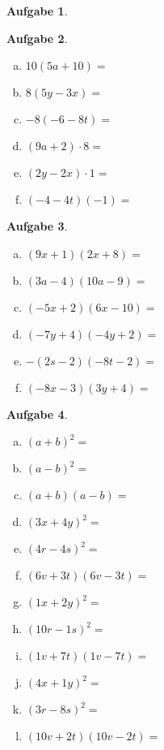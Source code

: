 \documentclass[12pt,fleqn]{article}
\theoremstyle{aufg}
\newtheorem{aufgabe}{Aufgabe}
\theoremstyle{bsp}
\begin{document}
\begin{flushleft}
\begin{aufgabe}
\begin{multicols}{2}
\end{multicols} 
\end{aufgabe} 
\begin{aufgabe} ~ \\ 
\begin{multicols}{3} 
\begin{enumerate}[a)] 
\item 
$10(5a+10)=$
\item 
$8(5y-3x)=$
\item 
$-8(-6-8t)=$
\item 
$(9a+2)\cdot 8=$
\item 
$(2y-2x)\cdot 1=$
\item 
$(-4-4t)(-1)=$
\end{enumerate} 
\end{multicols} 
\end{aufgabe} 
\begin{aufgabe} ~ \\ 
\begin{multicols}{3} 
\begin{enumerate}[a)] 
\item 
$(9x+1)(2x+8)=$
\item 
$(3a-4)(10a-9)=$
\item 
$(-5x+2)(6x-10)=$
\item 
$(-7y+4)(-4y+2)=$
\item 
$-(2s-2)(-8t-2)=$
\item 
$(-8x-3)(3y+4)=$
\end{enumerate} 
\end{multicols} 
\end{aufgabe} 
\begin{aufgabe} ~ \\ 
\begin{multicols}{3} 
\begin{enumerate}[a)] 
\item 
$(a+b)^2=$
\item 
$(a-b)^2=$
\item 
$(a+b)(a-b)=$
\item 
$(3x+4y)^2=$
\item 
$(4r-4s)^2=$
\item 
$(6v+3t)(6v-3t)=$
\item 
$(1x+2y)^2=$
\item 
$(10r-1s)^2=$
\item 
$(1v+7t)(1v-7t)=$
\item 
$(4x+1y)^2=$
\item 
$(3r-8s)^2=$
\item 
$(10v+2t)(10v-2t)=$
\end{enumerate} 
\end{multicols} 
\end{aufgabe} 
\end{flushleft} 
\end{document}
